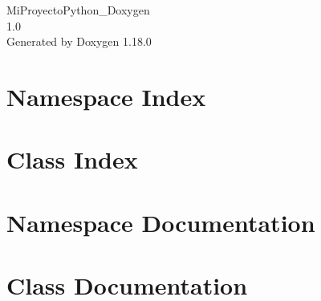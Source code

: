 \documentclass[twoside]{book}
\newcommand{\+}{\discretionary{\mbox{\scriptsize$\hookleftarrow$}}{}{}}
\newcommand{\clearemptydoublepage}{%
    \newpage{\pagestyle{empty}\cleardoublepage}%
  }
\begin{document}
  \raggedbottom
    \hypersetup{pageanchor=false,
                bookmarksnumbered=true,
                pdfencoding=unicode
               }
  \begin{titlepage}
  \vspace*{7cm}
  \begin{center}%
  {\Large Mi\+Proyecto\+Python\+\_\+\+Doxygen}\\
  [1ex]\large 1.\+0 \\
  \vspace*{1cm}
  {\large Generated by Doxygen 1.18.0}\\
  \end{center}
  \end{titlepage}
  \clearemptydoublepage
  \tableofcontents
  \clearemptydoublepage
  \hypersetup{pageanchor=true}
\chapter{Namespace Index}

\chapter{Class Index}

\chapter{Namespace Documentation}

\chapter{Class Documentation}

  \backmatter
  \newpage
  \clearemptydoublepage
  \printindex
\end{document}
